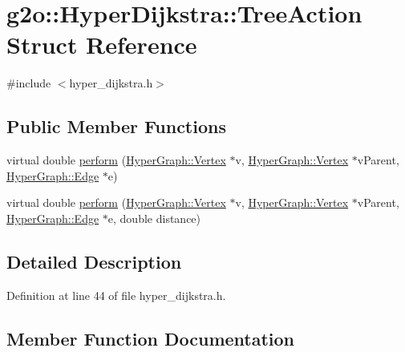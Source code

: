 \hypertarget{structg2o_1_1HyperDijkstra_1_1TreeAction}{}\section{g2o\+:\+:Hyper\+Dijkstra\+:\+:Tree\+Action Struct Reference}
\label{structg2o_1_1HyperDijkstra_1_1TreeAction}


{\ttfamily \#include $<$hyper\+\_\+dijkstra.\+h$>$}

\subsection*{Public Member Functions}
\begin{DoxyCompactItemize}
\item 
virtual double \hyperlink{structg2o_1_1HyperDijkstra_1_1TreeAction_aacd1280762e801f05b04874950cf052b}{perform} (\hyperlink{classg2o_1_1HyperGraph_1_1Vertex}{Hyper\+Graph\+::\+Vertex} $\ast$v, \hyperlink{classg2o_1_1HyperGraph_1_1Vertex}{Hyper\+Graph\+::\+Vertex} $\ast$v\+Parent, \hyperlink{classg2o_1_1HyperGraph_1_1Edge}{Hyper\+Graph\+::\+Edge} $\ast$e)
\item 
virtual double \hyperlink{structg2o_1_1HyperDijkstra_1_1TreeAction_a2f78bac199af9afea7105f3dd9f2e963}{perform} (\hyperlink{classg2o_1_1HyperGraph_1_1Vertex}{Hyper\+Graph\+::\+Vertex} $\ast$v, \hyperlink{classg2o_1_1HyperGraph_1_1Vertex}{Hyper\+Graph\+::\+Vertex} $\ast$v\+Parent, \hyperlink{classg2o_1_1HyperGraph_1_1Edge}{Hyper\+Graph\+::\+Edge} $\ast$e, double distance)
\end{DoxyCompactItemize}


\subsection{Detailed Description}


Definition at line 44 of file hyper\+\_\+dijkstra.\+h.



\subsection{Member Function Documentation}

